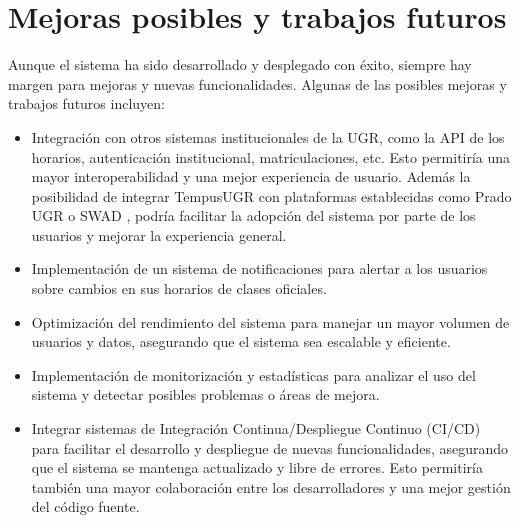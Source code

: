 \section{Mejoras posibles y trabajos futuros}

Aunque el sistema ha sido desarrollado y desplegado con éxito, siempre hay margen para mejoras y nuevas funcionalidades. Algunas de las posibles mejoras y trabajos futuros incluyen:
\begin{itemize}
    \item Integración con otros sistemas institucionales de la UGR, como la API de los horarios, autenticación institucional, matriculaciones, etc. Esto permitiría una mayor interoperabilidad y una mejor experiencia de usuario.
    Además la posibilidad de integrar TempusUGR con plataformas establecidas como Prado UGR o SWAD , podría facilitar la adopción del sistema por parte de los usuarios y mejorar la experiencia general.
    \item Implementación de un sistema de notificaciones para alertar a los usuarios sobre cambios en sus horarios de clases oficiales.
    \item Optimización del rendimiento del sistema para manejar un mayor volumen de usuarios y datos, asegurando que el sistema sea escalable y eficiente.
    \item Implementación  de monitorización y estadísticas para analizar el uso del sistema y detectar posibles problemas o áreas de mejora.
    \item Integrar sistemas de Integración Continua/Despliegue Continuo (CI/CD) para facilitar el desarrollo y despliegue de nuevas funcionalidades, asegurando que el sistema se mantenga actualizado y libre de errores. Esto permitiría también una mayor colaboración entre los desarrolladores y una mejor gestión del código fuente.
\end{itemize}
